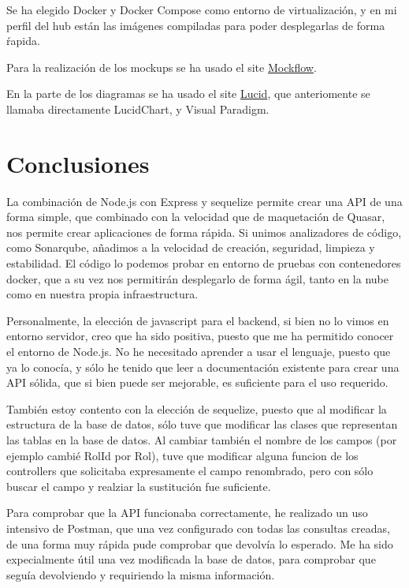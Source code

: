 \documentclass[11pt,spanish,listoffigures,listoftables]{tfgetsinf}
\begin{document}
Se ha elegido Docker y Docker Compose como entorno de virtualización, y en mi perfil del hub están las imágenes compiladas para poder desplegarlas de forma ŕapida. 

Para la realización de los mockups se ha usado el site \href{https://mockflow.com/app/#Wireframe}{Mockflow}.

En la parte de los diagramas se ha usado el site \href{https://lucid.app/}{Lucid}, que anteriomente se llamaba directamente LucidChart, y Visual Paradigm.


\chapter{Conclusiones}

La combinación de Node.js con Express y sequelize permite crear una API de una forma simple, que combinado con la velocidad que de maquetación de Quasar, nos permite crear aplicaciones de forma rápida.
Si unimos analizadores de código, como Sonarqube, añadimos a la velocidad de creación, seguridad, limpieza y estabilidad. 
El código lo podemos probar en entorno de pruebas con contenedores docker, que a su vez nos permitirán desplegarlo de forma ágil, tanto en la nube como en nuestra propia infraestructura.

Personalmente, la elección de javascript para el backend, si bien no lo vimos en entorno servidor, creo que ha sido positiva, puesto que me ha permitido conocer el entorno de Node.js. 
No he necesitado aprender a usar el lenguaje, puesto que ya lo conocía, y sólo he tenido que leer a documentación existente para crear una API sólida, que si bien puede ser mejorable, es suficiente para el uso requerido.

También estoy contento con la elección de sequelize, puesto que al modificar la estructura de la base de datos, sólo tuve que modificar las clases que representan las tablas en la base de datos. 
Al cambiar también el nombre de los campos (por ejemplo cambié RolId por Rol), tuve que modificar alguna funcion de los controllers que solicitaba expresamente el campo renombrado, pero con sólo buscar el campo y realziar la sustitución fue suficiente.

Para comprobar que la API funcionaba correctamente, he realizado un uso intensivo de Postman, que una vez configurado con todas las consultas creadas, de una forma muy rápida pude comprobar que devolvía lo esperado.
Me ha sido expecialmente útil una vez modificada la base de datos, para comprobar que seguía devolviendo y requiriendo la misma información. 
\end{document}
